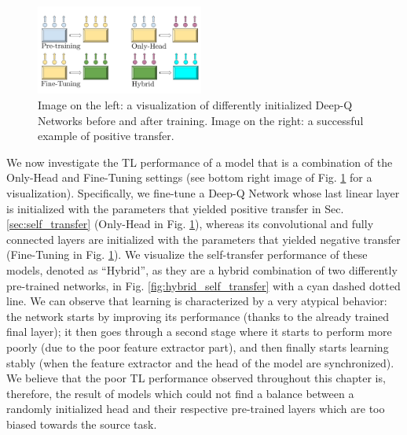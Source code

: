 \begin{figure}[ht]
\begin{minipage}{0.5\textwidth}
	\centering
\includegraphics[width=5.5cm]{./Images/Chapter08/new_networks_2.pdf}
\end{minipage}%
\begin{minipage}{0.5\textwidth}
	\centering
	
\end{minipage}
	\caption{Image on the left: a visualization of differently initialized Deep-Q Networks before and after training. Image on the right: a successful example of positive transfer.}
\label{fig:networks}
\end{figure}

We now investigate the TL performance of a model that is a combination of the Only-Head and Fine-Tuning settings (see bottom right image of Fig. \ref{fig:networks} for a visualization). Specifically, we fine-tune a Deep-Q Network whose last linear layer is initialized with the parameters that yielded positive transfer in Sec. \ref{sec:self_transfer} (Only-Head in Fig. \ref{fig:networks}), whereas its convolutional and fully connected layers are initialized with the parameters that yielded negative transfer (Fine-Tuning in Fig. \ref{fig:networks}). We visualize the self-transfer performance of these models, denoted as ``Hybrid'', as they are a hybrid combination of two differently pre-trained networks, in Fig. \ref{fig:hybrid_self_transfer} with a cyan dashed dotted line. We can observe that learning is characterized by a very atypical behavior: the network starts by improving its performance (thanks to the already trained final layer); it then goes through a second stage where it starts to perform more poorly (due to the poor feature extractor part), and then finally starts learning stably (when the feature extractor and the head of the model are synchronized). We believe that the poor TL performance observed throughout this chapter is, therefore, the result of models which could not find a balance between a randomly initialized head and their respective pre-trained layers which are too biased towards the source task.   

